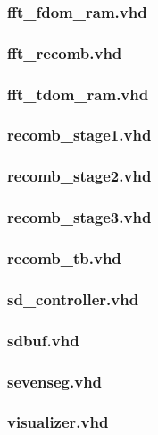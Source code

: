 \documentclass{article}
\begin{document}
	\subsubsection{fft\_fdom\_ram.vhd}
	
	\subsubsection{fft\_recomb.vhd}
	
	\subsubsection{fft\_tdom\_ram.vhd}
	
	\subsubsection{recomb\_stage1.vhd}
	
	\subsubsection{recomb\_stage2.vhd}
	
	\subsubsection{recomb\_stage3.vhd}
	
	\subsubsection{recomb\_tb.vhd}
	
	\subsubsection{sd\_controller.vhd}
	
	\subsubsection{sdbuf.vhd}
	
	\subsubsection{sevenseg.vhd}
	
	\subsubsection{visualizer.vhd}
	
\end{document}
